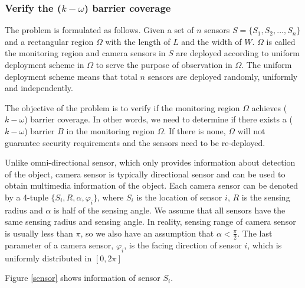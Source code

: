\subsubsection{Verify the ($k-\omega$) barrier coverage}
The problem is formulated as follows. Given a set of $n$ sensors $S=\{S_1,S_2,...,S_n\}$ and a rectangular region $\Omega$ with the length of $L$ and the width of $W$. $\Omega$ is called the monitoring region and camera sensors in $S$ are deployed according to uniform deployment scheme in $\Omega$ to serve the purpose of observation in $\Omega$. The uniform deployment scheme means that total $ n $ sensors are deployed randomly, uniformly and independently.\par

The objective of the problem is to verify if the monitoring region $\Omega$ achieves ($k-\omega$) barrier coverage. In other words, we need to determine if there exists a ($k-\omega$) barrier $B$ in the monitoring region $\Omega$. If there is none, $\Omega$ will not guarantee security requirements and the sensors need to be re-deployed.\par

Unlike omni-directional sensor, which only provides information about detection of the object, camera sensor is typically directional sensor and can be used to obtain multimedia information of the object. Each camera sensor can be denoted by a 4-tuple $\{S_i, R, \alpha, \varphi_i\}$, where $S_i$ is the location of sensor $i$, $R$ is the sensing radius and $\alpha$ is half of the sensing angle. We assume that all sensors have the same sensing radius and sensing angle. In reality, sensing range of camera sensor is usually less than $\pi$, so we also have an assumption that $\alpha < \displaystyle\frac{\pi}{2}$. The last parameter of a camera sensor, $\varphi_i$, is the facing direction of sensor $i$, which is uniformly distributed in $[0,2\pi]$ \par
Figure \ref{sensor} shows information of sensor $S_i$.
%

